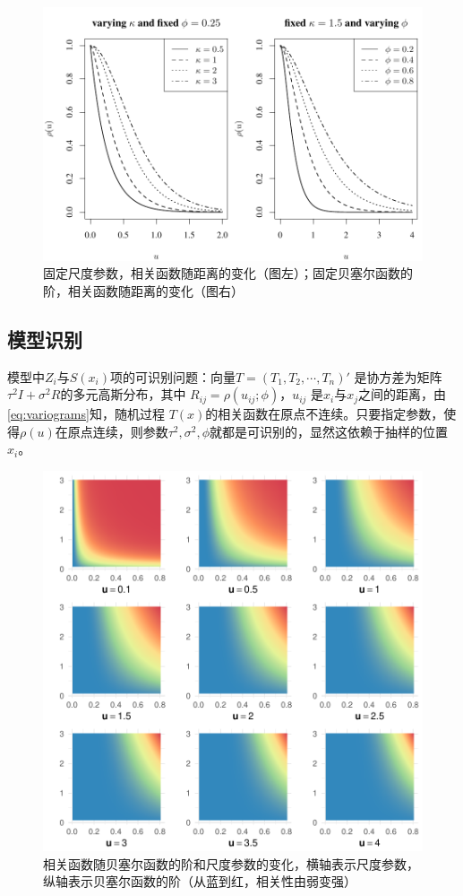\documentclass[hyperref, a4paper, UTF8, zihao = -4, linespread = 1.25, scheme = chinese]{ctexbook}
\begin{document}
\begin{figure}

{\centering \includegraphics[width=0.7\linewidth]{figures/matern} 

}

\caption{固定尺度参数，相关函数随距离的变化（图左）；固定贝塞尔函数的阶，相关函数随距离的变化（图右）}\label{fig:matern-2d}
\end{figure}

\subsection{模型识别}

模型中\(Z_{i}\)与\(S(x_i)\)项的可识别问题：向量\(T=(T_1,T_2,\cdots,T_n)'\)
是协方差为矩阵 \(\tau^2I+\sigma^2R\)的多元高斯分布，其中
\(R_{ij}=\rho(u_{ij};\phi)\)，\(u_{ij}\)
是\(x_i\)与\(x_j\)之间的距离，由\eqref{eq:variograms}知，随机过程
\(T(x)\)的相关函数在原点不连续。只要指定参数，使得\(\rho(u)\)在原点连续，则参数\(\tau^2,\sigma^2,\phi\)就都是可识别的，显然这依赖于抽样的位置\(x_i\)\citep{Diggle2002}。
\newpage

\begin{figure}

{\centering \includegraphics[width=0.7\linewidth]{figures/matern-3d} 

}

\caption{相关函数随贝塞尔函数的阶和尺度参数的变化，横轴表示尺度参数，纵轴表示贝塞尔函数的阶（从蓝到红，相关性由弱变强）}\label{fig:matern-3d}
\end{figure}
\end{document}
